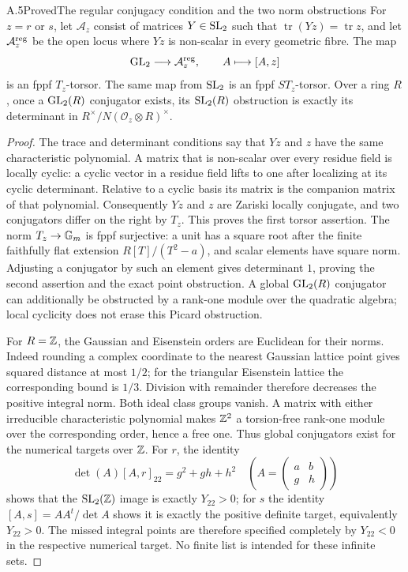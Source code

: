 \begin{statement}{A.5}{Proved}{The regular conjugacy condition and the two norm obstructions}
For $z=r$ or $s$, let $\mathcal A_z$ consist of matrices $Y\in\operatorname{SL}_2$
such that $\operatorname{tr}(Yz)=\operatorname{tr}z$, and let
$\mathcal A_z^{\rm reg}$ be the open locus where $Yz$ is non-scalar
in every geometric fibre. The map
\[
 \operatorname{GL}_2\longrightarrow\mathcal A_z^{\rm reg},\qquad
 A\longmapsto[A,z]
\]
is an fppf $T_z$-torsor. The same map from $\operatorname{SL}_2$ is an fppf
$ST_z$-torsor. Over a ring $R$, once a $\operatorname{GL}_2(R)$ conjugator exists,
its $\operatorname{SL}_2(R)$ obstruction is exactly its determinant in
$R^\times/N(\mathcal O_z\otimes R)^\times$.
\end{statement}
\begin{proof}
The trace and determinant conditions say that $Yz$ and $z$ have the
same characteristic polynomial. A matrix that is non-scalar over
every residue field is locally cyclic: a cyclic vector in a residue
field lifts to one after localizing at its cyclic determinant.
Relative to a cyclic basis its matrix is the companion matrix of that
polynomial. Consequently $Yz$ and $z$ are Zariski locally conjugate,
and two conjugators differ on the right by $T_z$. This proves the
first torsor assertion. The norm $T_z\to\mathbb G_m$ is fppf surjective:
a unit has a square root after the finite faithfully flat extension
$R[T]/(T^2-a)$, and scalar elements have square norm. Adjusting a
conjugator by such an element gives determinant $1$, proving the
second assertion and the exact point obstruction. A global
$\operatorname{GL}_2(R)$ conjugator can additionally be obstructed by a rank-one
module over the quadratic algebra; local cyclicity does not erase
this Picard obstruction.

For $R=\mathbb Z$, the Gaussian and Eisenstein orders are Euclidean for
their norms. Indeed rounding a complex coordinate to the nearest
Gaussian lattice point gives squared distance at most $1/2$; for the
triangular Eisenstein lattice the corresponding bound is $1/3$.
Division with remainder therefore decreases the positive integral
norm. Both ideal class groups vanish. A matrix with either
irreducible characteristic polynomial makes $\mathbb Z^2$ a torsion-free
rank-one module over the corresponding order, hence a free one.
Thus global conjugators exist for the numerical targets over $\mathbb Z$.
For $r$, the identity
\[
 \det(A)[A,r]_{22}=g^2+gh+h^2
 \quad\left(A=\begin{pmatrix}a&b\\g&h\end{pmatrix}\right)
\]
shows that the $\operatorname{SL}_2(\mathbb Z)$ image is exactly $Y_{22}>0$; for $s$ the
identity $[A,s]=AA^t/\det A$ shows it is exactly the positive definite
target, equivalently $Y_{22}>0$. The missed integral points are
therefore specified completely by $Y_{22}<0$ in the respective
numerical target. No finite list is intended for these infinite sets.
\end{proof}

